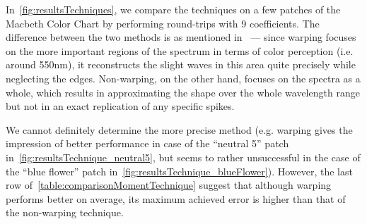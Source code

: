 In~\cref{fig:resultsTechniques}, we compare the techniques on a few patches of the Macbeth Color Chart by performing round-trips with 9 coefficients. The difference between the two methods is as mentioned in~\citet{trigonometricMomentsPaper} --- since warping focuses on the more important regions of the spectrum in terms of color perception (i.e. around 550nm), it reconstructs the slight waves in this area quite precisely while neglecting the edges. Non-warping, on the other hand, focuses on the spectra as a whole, which results in approximating the shape over the whole wavelength range but not in an exact replication of any specific spikes.

We cannot definitely determine the more precise method (e.g. warping gives the impression of better performance in case of the ``neutral 5'' patch in~\cref{fig:resultsTechnique_neutral5}, but seems to rather unsuccessful in the case of the ``blue flower'' patch in~\cref{fig:resultsTechnique_blueFlower}). However, the last row of~\cref{table:comparisonMomentTechnique} suggest that although warping performs better on average, its maximum achieved error is higher than that of the non-warping technique.

